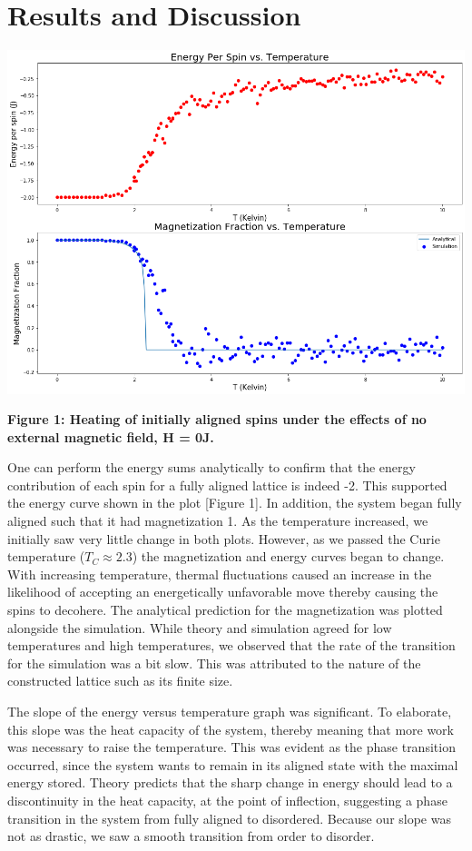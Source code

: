 \documentclass[11pt]{article}
\begin{document}
\section{Results and Discussion}
\label{sec:results}

\begin{center}
    \includegraphics[width = \linewidth]{alignedspinNoField.png}
    \caption{\textbf{Figure 1: Heating of initially aligned spins under the effects of no external magnetic field, H = 0J.}}
    \label{fig:plt1}
\end{center}

One can perform the energy sums analytically to confirm that the energy contribution of each spin for a fully aligned lattice is indeed -2. This supported the energy curve shown in the plot [Figure 1]. In addition, the system began fully aligned such that it had magnetization 1. As the temperature increased, we initially saw very little change in both plots. However, as we passed the Curie temperature ($T_C \approx 2.3$) the magnetization and energy curves began to change. With increasing temperature, thermal fluctuations caused an increase in the likelihood of accepting an energetically unfavorable move thereby causing the spins to decohere. The analytical prediction for the magnetization was plotted alongside the simulation. While theory and simulation agreed for low temperatures and high temperatures, we observed that the rate of the transition for the simulation was a bit slow. This was attributed to the nature of the constructed lattice such as its finite size.

The slope of the energy versus temperature graph was significant. To elaborate, this slope was the heat capacity of the system, thereby meaning that more work was necessary to raise the temperature. This was evident as the phase transition occurred, since the system wants to remain in its aligned state with the maximal energy stored. Theory predicts that the sharp change in energy should lead to a discontinuity in the heat capacity, at the point of inflection, suggesting a phase transition in the system from fully aligned to disordered. Because our slope was not as drastic, we saw a smooth transition from order to disorder. 
\end{document}

